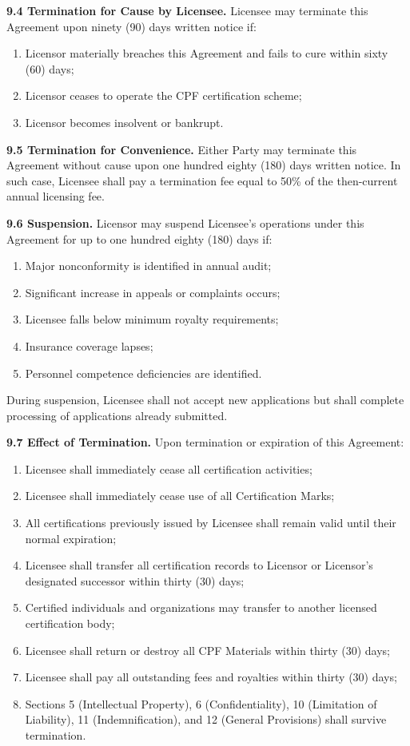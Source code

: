 \documentclass[11pt,a4paper]{article}
\begin{document}
\textbf{9.4 Termination for Cause by Licensee.} Licensee may terminate this Agreement upon ninety (90) days written notice if:

\begin{enumerate}[label=\alph*)]
\item Licensor materially breaches this Agreement and fails to cure within sixty (60) days;
\item Licensor ceases to operate the CPF certification scheme;
\item Licensor becomes insolvent or bankrupt.
\end{enumerate}

\textbf{9.5 Termination for Convenience.} Either Party may terminate this Agreement without cause upon one hundred eighty (180) days written notice. In such case, Licensee shall pay a termination fee equal to 50\% of the then-current annual licensing fee.

\textbf{9.6 Suspension.} Licensor may suspend Licensee's operations under this Agreement for up to one hundred eighty (180) days if:

\begin{enumerate}[label=\alph*)]
\item Major nonconformity is identified in annual audit;
\item Significant increase in appeals or complaints occurs;
\item Licensee falls below minimum royalty requirements;
\item Insurance coverage lapses;
\item Personnel competence deficiencies are identified.
\end{enumerate}

During suspension, Licensee shall not accept new applications but shall complete processing of applications already submitted.

\textbf{9.7 Effect of Termination.} Upon termination or expiration of this Agreement:

\begin{enumerate}[label=\alph*)]
\item Licensee shall immediately cease all certification activities;
\item Licensee shall immediately cease use of all Certification Marks;
\item All certifications previously issued by Licensee shall remain valid until their normal expiration;
\item Licensee shall transfer all certification records to Licensor or Licensor's designated successor within thirty (30) days;
\item Certified individuals and organizations may transfer to another licensed certification body;
\item Licensee shall return or destroy all CPF Materials within thirty (30) days;
\item Licensee shall pay all outstanding fees and royalties within thirty (30) days;
\item Sections 5 (Intellectual Property), 6 (Confidentiality), 10 (Limitation of Liability), 11 (Indemnification), and 12 (General Provisions) shall survive termination.
\end{enumerate}
\end{document}
